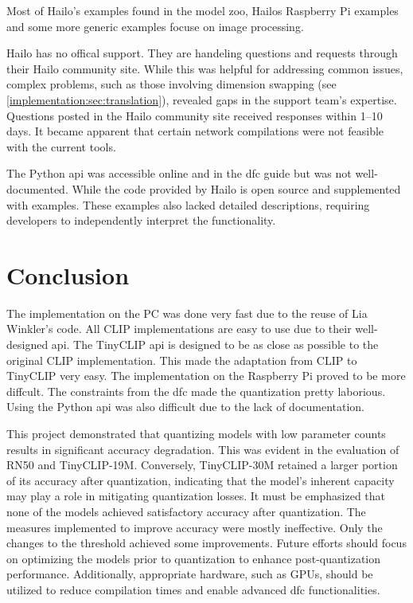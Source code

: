 Most of Hailo's examples found in the model zoo\cite{hailo_model_zoo}, Hailos Raspberry Pi examples\cite{hailo_rpi5_examples} and some more generic examples\cite{hailo_application_code_examples} focuse on image processing.

Hailo has no offical support.
They are handeling questions and requests through their Hailo community site.  
While this was helpful for addressing common issues, complex problems, such as those involving dimension swapping (see \cref{implementation:sec:translation}), revealed gaps in the support team's expertise.
Questions posted in the Hailo community site received responses within 1–10 days. 
It became apparent that certain network compilations were not feasible with the current tools.  

The Python \acrfull{api} was accessible online and in the \acrshort{dfc} guide but was not well-documented.  
While the code provided by Hailo is open source and supplemented with examples.
These examples also lacked detailed descriptions, requiring developers to independently interpret the functionality.  
 

\section{Conclusion}
The implementation on the PC was done very fast due to the reuse of Lia Winkler's code.
All CLIP implementations are easy to use due to their well-designed \acrshort{api}.
The TinyCLIP \acrshort{api} is designed to be as close as possible to the original CLIP implementation.
This made the adaptation from CLIP to TinyCLIP very easy.
The implementation on the Raspberry Pi proved to be more diffcult.
The constraints from the \acrshort{dfc} made the quantization pretty laborious.
Using the Python \acrshort{api} was also difficult due to the lack of documentation.

This project demonstrated that quantizing models with low parameter counts results in significant accuracy degradation.
This was evident in the evaluation of RN50 and TinyCLIP-19M.  
Conversely, TinyCLIP-30M retained a larger portion of its accuracy after quantization, indicating that the model's inherent capacity may play a role in mitigating quantization losses.  
It must be emphasized that none of the models achieved satisfactory accuracy after quantization.  
The measures implemented to improve accuracy were mostly ineffective.
Only the changes to the threshold achieved some improvements. 
Future efforts should focus on optimizing the models prior to quantization to enhance post-quantization performance.  
Additionally, appropriate hardware, such as GPUs, should be utilized to reduce compilation times and enable advanced \acrshort{dfc} functionalities.  

